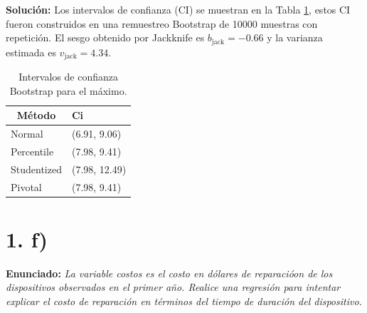 \documentclass[fleqn]{article}
\begin{document}
\textbf{Solución:} Los intervalos de confianza (CI) se muestran en la Tabla \ref{tab:cis}, estos CI fueron construidos en una remuestreo Bootstrap de 10000 muestras con repetición. El sesgo obtenido por Jackknife es $b_{\mathrm{jack}}=-0.66$ y la varianza estimada es $v_{\mathrm{jack}}=4.34$.
\begin{table}[H]
\centering
\begin{tabular}{ll}
\hline
\multicolumn{1}{c}{\textbf{Método}} & \textbf{Ci} \\ \hline
Normal                              & (6.91, 9.06)  \\
Percentile                          & (7.98, 9.41)  \\
Studentized                         & (7.98, 12.49) \\
Pivotal                             & (7.98, 9.41)  \\ \hline
\end{tabular}
\caption{Intervalos de confianza Bootstrap para el máximo.}
\label{tab:cis}
\end{table}
\section*{1. f)}
\textbf{Enunciado:} \textit{La variable costos es el costo en dólares de reparacióon de los dispositivos observados en el primer año. Realice una regresión para intentar explicar el costo de reparación en términos del tiempo de duración del dispositivo.}
\end{document}

